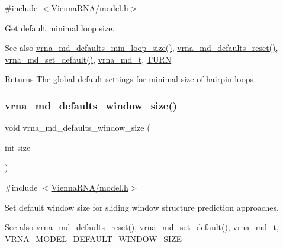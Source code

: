 {\ttfamily \#include $<$\hyperlink{model_8h}{Vienna\+R\+N\+A/model.\+h}$>$}



Get default minimal loop size. 

\begin{DoxySeeAlso}{See also}
\hyperlink{group__model__details_gac152f1e78c1058a10261022c8dfda0f7}{vrna\+\_\+md\+\_\+defaults\+\_\+min\+\_\+loop\+\_\+size()}, \hyperlink{group__model__details_ga70834424cf804d149937de89f80ceb45}{vrna\+\_\+md\+\_\+defaults\+\_\+reset()}, \hyperlink{group__model__details_ga8ac6ff84936282436f822644bf841f66}{vrna\+\_\+md\+\_\+set\+\_\+default()}, \hyperlink{group__model__details_ga1f8a10e12a0a1915f2a4eff0b28ea17c}{vrna\+\_\+md\+\_\+t}, \hyperlink{constants_8h_ae646250fd59311356c7e5722a81c3a96}{T\+U\+RN} 
\end{DoxySeeAlso}
\begin{DoxyReturn}{Returns}
The global default settings for minimal size of hairpin loops 
\end{DoxyReturn}
\mbox{\label{group__model__details_ga7b802ce0e8c3181bf5cb580de6d5b26a}} 
\subsubsection{\texorpdfstring{vrna\+\_\+md\+\_\+defaults\+\_\+window\+\_\+size()}{vrna\_md\_defaults\_window\_size()}}
{\footnotesize\ttfamily void vrna\+\_\+md\+\_\+defaults\+\_\+window\+\_\+size (\begin{DoxyParamCaption}\item[{int}]{size }\end{DoxyParamCaption})}



{\ttfamily \#include $<$\hyperlink{model_8h}{Vienna\+R\+N\+A/model.\+h}$>$}



Set default window size for sliding window structure prediction approaches. 

\begin{DoxySeeAlso}{See also}
\hyperlink{group__model__details_ga70834424cf804d149937de89f80ceb45}{vrna\+\_\+md\+\_\+defaults\+\_\+reset()}, \hyperlink{group__model__details_ga8ac6ff84936282436f822644bf841f66}{vrna\+\_\+md\+\_\+set\+\_\+default()}, \hyperlink{group__model__details_ga1f8a10e12a0a1915f2a4eff0b28ea17c}{vrna\+\_\+md\+\_\+t}, \hyperlink{group__model__details_ga8de04a9cb57e811e313b0f9f207f6bdb}{V\+R\+N\+A\+\_\+\+M\+O\+D\+E\+L\+\_\+\+D\+E\+F\+A\+U\+L\+T\+\_\+\+W\+I\+N\+D\+O\+W\+\_\+\+S\+I\+ZE} 
\end{DoxySeeAlso}

